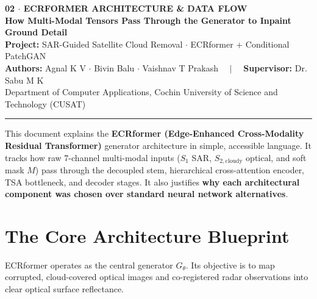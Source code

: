 \documentclass[11pt,a4paper]{article}
\begin{document}
\begin{center}
    {\LARGE \textbf{\textcolor{primary}{02 $\cdot$ ECRFORMER ARCHITECTURE \& DATA FLOW}}}\\[0.4em]
    {\large \textbf{How Multi-Modal Tensors Pass Through the Generator to Inpaint Ground Detail}}\\[0.6em]
    {\small \textbf{Project:} SAR-Guided Satellite Cloud Removal $\cdot$ ECRformer + Conditional PatchGAN}\\
    {\small \textbf{Authors:} Agnal K V $\cdot$ Bivin Balu $\cdot$ Vaishnav T Prakash $\quad|\quad$ \textbf{Supervisor:} Dr. Sabu M K}\\
    {\small Department of Computer Applications, Cochin University of Science and Technology (CUSAT)}
\end{center}
\vspace{-0.5em}
\noindent\rule{\linewidth}{1.2pt}

\vspace{0.8em}
\begin{tcolorbox}[colback=primary!5!white,colframe=primary,title=\textbf{Document Purpose \& Architecture Summary},fonttitle=\bfseries]
This document explains the \textbf{ECRformer (Edge-Enhanced Cross-Modality Residual Transformer)} generator architecture in simple, accessible language. It tracks how raw 7-channel multi-modal inputs ($S_1$ SAR, $S_{2,\text{cloudy}}$ optical, and soft mask $M$) pass through the decoupled stem, hierarchical cross-attention encoder, TSA bottleneck, and decoder stages. It also justifies \textbf{why each architectural component was chosen over standard neural network alternatives}.
\end{tcolorbox}

\section{The Core Architecture Blueprint}

ECRformer operates as the central generator $G_{\theta}$. Its objective is to map corrupted, cloud-covered optical images and co-registered radar observations into clear optical surface reflectance.
\end{document}
